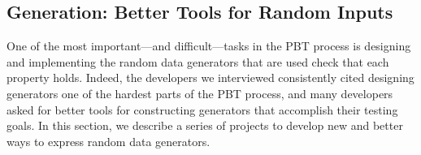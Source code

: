 \subsection{Generation: Better Tools for Random Inputs }\label{sec:gen}

One of the most important---and difficult---tasks in the PBT process is
designing and implementing the random data generators that are used check that
each property holds. Indeed, the developers we interviewed consistently
cited designing generators one of the hardest parts of the PBT process, and many
developers asked for better tools for constructing generators that accomplish
their testing goals. In this section, we describe a series of projects
to develop new and better ways to express random data generators.

